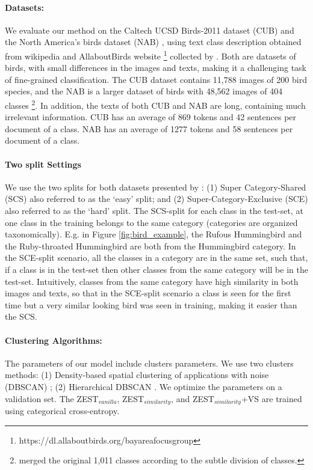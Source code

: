 \documentclass[11pt,a4paper]{article}
\begin{document}
\paragraph{Datasets:}  We evaluate our method on the Caltech UCSD Birds-2011 dataset (CUB) \citet{wah2011caltech} and the North America’s birds dataset (NAB) \cite{van2015building}, using text class description obtained from wikipedia and AllaboutBirds website \footnote{https://dl.allaboutbirds.org/bayareafocusgroup} collected by \citet{elhoseiny2017link}. 
Both are datasets of birds, with small differences in the images and texts, making it a challenging task of fine-grained classification. The CUB dataset contains 11,788 images of 200 bird species, and the NAB
is a larger dataset of birds with 48,562 images of 404 classes \footnote{\citet{elhoseiny2017link} merged the original 1,011 classes according to the subtle division of classes.}.
In addition, the texts of both CUB and NAB are long, containing much irrelevant information. CUB has an average of 869 tokens and 42 sentences per document of a class. NAB has an average of 1277 tokens and 58 sentences per document of a class. 

\paragraph{Two split Settings} We use the two splits for both datasets presented by \citet{elhoseiny2017link}: (1) Super Category-Shared (SCS) also referred to as the \enquote*{easy} split; and (2) Super-Category-Exclusive (SCE) also referred to as the \enquote*{hard} split. The SCS-split for each class in the test-set, at one class in the training belongs to the same category (categories are organized taxonomically). E.g. in Figure \ref{fig:bird_example}, the Rufous Hummingbird and the Ruby-throated Hummingbird are both from the Hummingbird category. In the SCE-split scenario, all the classes in a category are in the same set, such that, if a class is in the test-set then other classes from the same category will be in the test-set. Intuitively, classes from the same category have high similarity in both images and texts, so that in the SCE-split scenario a class is seen for the first time but a very similar looking bird was seen in training, making it easier than the SCS.

\paragraph{Clustering Algorithms:}
The parameters of our model include clusters parameters.
We use two clusters methods: (1) Density-based spatial clustering of applications with noise (DBSCAN) \citep{ester1996density}; (2) Hierarchical DBSCAN \citep{mcinnes2017hdbscan}.
We optimize the parameters on a validation set. The ZEST$_{vanilla}$, ZEST$_{similarity}$, and ZEST$_{similarity}$+VS are trained using categorical cross-entropy.
\end{document}

